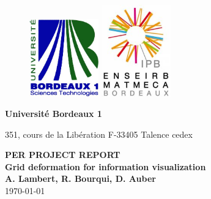 \begin{titlepage}
  \begin {figure}[ht]
	\includegraphics[angle=0,width=3cm]{img/logobordeaux1.jpg}
        \hspace{11cm}
	\includegraphics[angle=0,width=3cm]{img/logo.jpg}
	\label{logo}
  \end {figure}
  \begin{flushleft}
    \textbf{Université Bordeaux 1}

    351, cours de la Libération 
    F-33405 Talence cedex 
    
  \end{flushleft}
  
  \vspace{4cm}
	\begin{center}
	  {\bf PER PROJECT REPORT}\\
	  \vspace{1cm}
		 {\LARGE\bf Grid deformation for information visualization}\\
	   \vspace{1cm}
		   {\small\bf A. Lambert, R. Bourqui, D. Auber}\\
\vspace{1cm}
           \today

	\end{center}



\end{titlepage}
